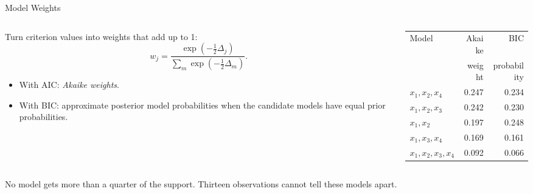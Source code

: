 \begin{frame}{Model Weights}
    \begin{columns}[T]
        \begin{column}{0.45\textwidth}
            Turn criterion values into weights that add up to 1:
            \[
            w_j=\frac{\exp(-\tfrac12\Delta_j)}{\sum_m\exp(-\tfrac12\Delta_m)} .
            \]
            \begin{itemize}
                \item With AIC: \emph{Akaike weights}.
                \item With BIC: approximate posterior model probabilities when the candidate models have equal prior probabilities.
            \end{itemize}
        \end{column}
        \begin{column}{0.55\textwidth}
            \centering
            \small
            \begin{tabular}{lrr}
                \toprule
                Model & Akaike & BIC \\
                & weight & probability \\
                \midrule
                $x_1,x_2,x_4$ & 0.247 & 0.234 \\
                $x_1,x_2,x_3$ & 0.242 & 0.230 \\
                $x_1,x_2$ & 0.197 & 0.248 \\
                $x_1,x_3,x_4$ & 0.169 & 0.161 \\
                $x_1,x_2,x_3,x_4$ & 0.092 & 0.066 \\
                \bottomrule
            \end{tabular}
        \end{column}
    \end{columns}
    \svspace{0.8em}
    No model gets more than a quarter of the support. Thirteen observations cannot tell these models apart.
\end{frame}


